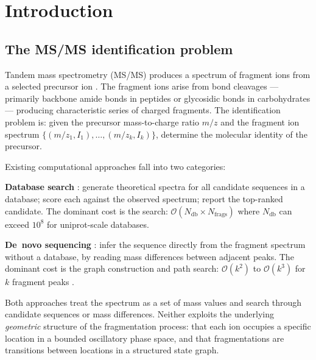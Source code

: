 \documentclass[twocolumn,10pt,a4paper]{article}
\theoremstyle{thmstyle}
\theoremstyle{definition}
\theoremstyle{remark}
\begin{document}
\begin{abstract}
\bigskip\noindent\textbf{Keywords:}
partition state graph; S-entropy coordinates; bidirectional Dijkstra;
virtual substates; transition states; tandem mass spectrometry; de novo
sequencing; fragmentation pathway; bounded phase space; partition bijection
\end{abstract}

\tableofcontents

\section{Introduction}
\label{sec:intro}

\subsection{The MS/MS identification problem}

Tandem mass spectrometry (MS/MS) produces a spectrum of fragment ions
from a selected precursor ion \citep{biemann1992}. The fragment ions
arise from bond cleavages — primarily backbone amide bonds in peptides
or glycosidic bonds in carbohydrates --- producing characteristic series
of charged fragments. The identification problem is: given the precursor
mass-to-charge ratio $m/z$ and the fragment ion spectrum
$\{(m/z_1, I_1), \ldots, (m/z_k, I_k)\}$, determine the molecular
identity of the precursor.

Existing computational approaches fall into two categories:

\textbf{Database search} \citep{eng1994, perkins1999}: generate theoretical
spectra for all candidate sequences in a database; score each against the
observed spectrum; report the top-ranked candidate. The dominant cost is
the search: $\mathcal{O}(N_\text{db} \times N_\text{frags})$ where
$N_\text{db}$ can exceed $10^8$ for uniprot-scale databases.

\textbf{De~novo sequencing} \citep{frank2005, ma2003}: infer the sequence
directly from the fragment spectrum without a database, by reading mass
differences between adjacent peaks. The dominant cost is the graph
construction and path search: $\mathcal{O}(k^2)$ to $\mathcal{O}(k^3)$
for $k$ fragment peaks \citep{bandeira2007}.

Both approaches treat the spectrum as a set of mass values and search
through candidate sequences or mass differences. Neither exploits the
underlying \emph{geometric} structure of the fragmentation process: that
each ion occupies a specific location in a bounded oscillatory phase space,
and that fragmentations are transitions between locations in a structured
state graph.
\end{document}

